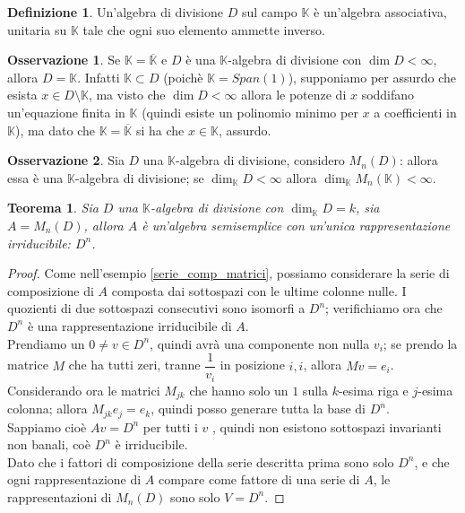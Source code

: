 \documentclass[11pt]{article}
\theoremstyle{plain}
\newtheorem{thm}{Teorema}[section]
\theoremstyle{definition}
\newtheorem{defn}{Definizione}[section]
\newtheorem*{rem}{Osservazione}
\theoremstyle{remark}
\newcommand{\K}{\mathbb{K}}
\begin{document}
\begin{defn}
	Un'algebra di divisione $D$ sul campo $\K$ è un'algebra associativa, unitaria su $\K$ tale che ogni suo elemento ammette inverso.
\end{defn}

\begin{rem}
	Se $\K=\overline{\K}$ e $D$ è una $\K$-algebra di divisione con $\dim D<\infty$, allora $D=\K$. Infatti $\K\subset D$ (poichè $\K=Span(1)$), supponiamo per assurdo che esista $x\in D\setminus \K$, ma visto che $\dim D < \infty$ allora le potenze di $x$ soddifano un'equazione finita in $\K$ (quindi esiste un polinomio minimo per $x$ a coefficienti in $\K$), ma dato che $\K=\overline{\K}$ si ha che $x\in \K$, assurdo.
\end{rem}

\begin{rem}
	Sia $D$ una $\K$-algebra di divisione, considero $M_n(D)$: allora essa è una $\K$-algebra di divisione; se $\dim_{\K}D<\infty$ allora $\dim_{\K} M_n(\K) < \infty$.
\end{rem}

\begin{thm}
	Sia $D$ una $\K$-algebra di divisione con $\dim_{\K} D=k$, sia $A=M_n(D)$, allora $A$ è un'algebra semisemplice con un'unica rappresentazione irriducibile: $D^n$.
\end{thm}

\begin{proof}
	Come nell'esempio \ref{serie_comp_matrici}, possiamo considerare la serie di composizione di $A$ composta dai sottospazi con le ultime colonne nulle. I quozienti di due sottospazi consecutivi sono isomorfi a $D^n$; verifichiamo ora che $D^n$ è una rappresentazione irriducibile di $A$.\\
	Prendiamo un $0\neq v\in D^n$, quindi avrà una componente non nulla $v_i$; se prendo la matrice $M$ che ha tutti zeri, tranne $\dfrac1{v_i}$ in posizione $i,i$, allora $Mv=e_i$.
	Considerando ora le matrici $M_{jk}$ che hanno solo un $1$ sulla $k$-esima riga e $j$-esima colonna; allora $M_{jk}e_j=e_k$, quindi posso generare tutta la base di $D^n$.\\
	Sappiamo cioè $Av=D^n$ per tutti i $v$ , quindi non esistono sottospazi invarianti non banali, coè $D^n$ è irriducibile.\\
	Dato che i fattori di composizione della serie descritta prima sono solo $D^n$, e che ogni rappresentazione di $A$ compare come fattore di una serie di $A$, le rappresentazioni di $M_n(D)$ sono solo $V=D^n$.
\end{proof}
\end{document}
